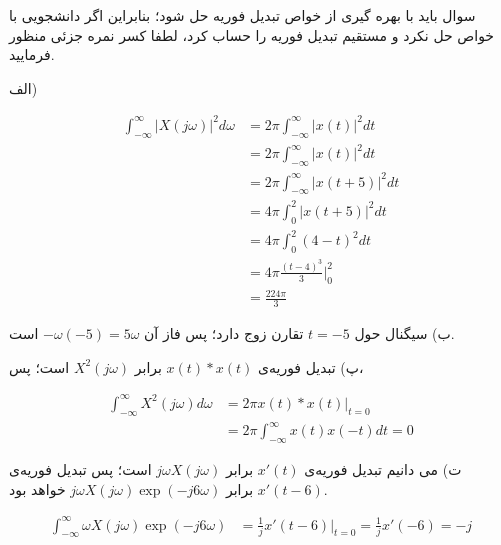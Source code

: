 \documentclass{article}
\newcommand{\qn}[1]{
\[
\begin{split}
#1
\end{split}
\]
}
\begin{document}
%

\large

{{\color{red}سوال باید با بهره گیری از خواص تبدیل فوریه حل شود؛ بنابراین اگر دانشجویی با خواص حل نکرد و مستقیم تبدیل فوریه را حساب کرد، لطفا کسر نمره جزئی منظور فرمایید.
}}

الف)

\qn{
\int_{-\infty}^\infty |X(j\omega)|^2d\omega
&=2\pi\int_{-\infty}^\infty |x(t)|^2dt
\\&=2\pi\int_{-\infty}^\infty |x(t)|^2dt
\\&=2\pi\int_{-\infty}^\infty |x(t+5)|^2dt
\\&=4\pi\int_{0}^2 |x(t+5)|^2dt
\\&=4\pi\int_{0}^2 (4-t)^2dt
\\&=4\pi\frac{(t-4)^3}{3}\Big|_0^2
\\&=\frac{224\pi}{3}
}

ب) سیگنال حول $t=-5$ تقارن زوج دارد؛ پس فاز آن
$
-\omega(-5)=5\omega
$
است.

پ) تبدیل فوریه‌ی 
$
x(t)*x(t)
$
برابر 
$
X^2(j\omega)
$
است؛ پس،
\qn{
\int_{-\infty}^\infty X^2(j\omega)d\omega
&=2\pi x(t)*x(t)\Big|_{t=0}
\\&=2\pi \int_{-\infty}^\infty x(t)x(-t)dt=0
}


ت) می دانیم تبدیل فوریه‌ی 
$
x'(t)
$
برابر 
$
j\omega X(j\omega)
$
است؛ پس تبدیل فوریه‌ی 
$
x'(t-6)
$
برابر 
$
j\omega X(j\omega) \exp(-j6\omega)
$
خواهد بود.
\qn{
\int_{-\infty}^\infty \omega X(j\omega) \exp(-j6\omega)
&=\frac{1}{j}x'(t-6)\Big|_{t=0}=\frac{1}{j}x'(-6)=-j
}
\end{document}
